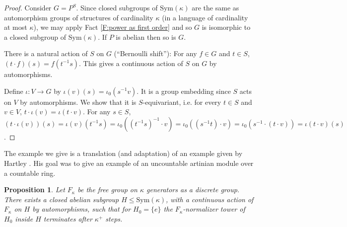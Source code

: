 \documentclass[10pt,a4paper]{amsart}
\theoremstyle{plain}
\newtheorem{proposition}[theorem]{Proposition}
\theoremstyle{definition}
\newcounter{step}
\begin{document}
\begin{proof}
     Consider $G=P^S$. Since closed subgroups of $\mathrm{Sym}(\kappa)$ are the same as automorphism groups of structures of cardinality $\kappa$ (in a language of cardinality at most $\kappa$), we may apply Fact \ref{F:power as first order} and so $G$ is isomorphic to a closed subgroup of $\mathrm{Sym}(\kappa)$.  If $P$ is abelian then so is $G$. 
     
     There is a natural action of $S$ on $G$ (``Bernoulli shift''): For any $f\in G$ and $t\in S$, $(t\cdot f)(s)=f(t^{-1}s)$. This gives a continuous action of $S$ on $G$ by automorphisms. 
    
    Define $\iota: V\to G$ by $\iota(v)(s)=\iota_0(s^{-1}v)$. It is a group embedding since $S$ acts on $V$ by automorphisms. We show that it is $S$-equivariant, i.e. for every $t\in S$ and $v\in V$, $t\cdot\iota(v)=\iota(t\cdot v)$. For any $s\in S$, $(t\cdot \iota(v))(s)=\iota(v)(t^{-1}s)=\iota_0((t^{-1}s)^{-1}\cdot v)=\iota_0((s^{-1}t)\cdot v)=\iota_0(s^{-1}\cdot(t\cdot v))=\iota(t\cdot v)(s)$.
\end{proof}


The example we give is a translation (and adaptation) of an example given by Hartley \cite[Proposition 3]{hartley}. His goal was to give an example of an uncountable artinian module over a countable ring. 
\begin{proposition}\label{P:Hartley-example}
    Let $F_\kappa$ be the free group on $\kappa$ generators as a discrete group. There exists a closed abelian subgroup $H\leq \mathrm{Sym}(\kappa)$, with a continuous action of $F_\kappa$ on $H$ by automorphisms,  such that for $H_0=\{e\}$ the $F_\kappa$-normalizer tower of $H_0$ inside $H$ terminates after $\kappa^+$ steps. 
\end{proposition}
\end{document}
